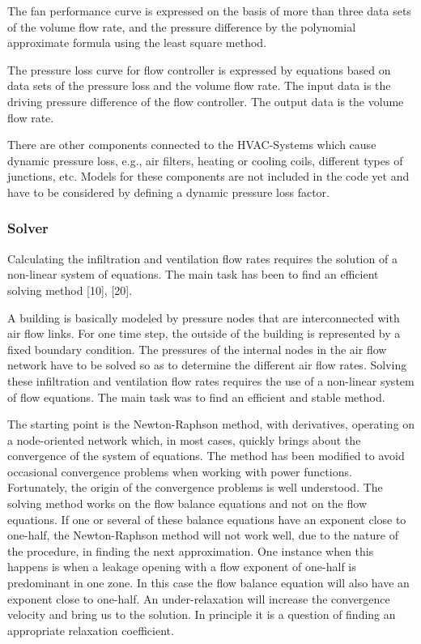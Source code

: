 \documentclass[10pt]{article}
\begin{document}
The fan performance curve is expressed on the basis of more than three data sets of the volume flow rate, and the pressure difference by the polynomial approximate formula using the least square method.

The pressure loss curve for flow controller is expressed by equations based on data sets of the pressure loss and the volume flow rate. The input data is the driving pressure difference of the flow controller. The output data is the volume flow rate.

There are other components connected to the HVAC-Systems which cause dynamic pressure loss, e.g., air filters, heating or cooling coils, different types of junctions, etc. Models for these components are not included in the code yet and have to be considered by defining a dynamic pressure loss factor.

\subsubsection{Solver}

Calculating the infiltration and ventilation flow rates requires the solution of a non-linear system of equations. The main task has been to find an efficient solving method [10], [20].

A building is basically modeled by pressure nodes that are interconnected with air flow links. For one time step, the outside of the building is represented by a fixed boundary condition. The pressures of the internal nodes in the air flow network have to be solved so as to determine the different air flow rates. Solving these infiltration and ventilation flow rates requires the use of a non-linear system of flow equations. The main task was to find an efficient and stable method.

The starting point is the Newton-Raphson method, with derivatives, operating on a node-oriented network which, in most cases, quickly brings about the convergence of the system of equations. The method has been modified to avoid occasional convergence problems when working with power functions. Fortunately, the origin of the convergence problems is well understood. The solving method works on the flow balance equations and not on the flow equations. If one or several of these balance equations have an exponent close to one-half, the Newton-Raphson method will not work well, due to the nature of the procedure, in finding the next approximation. One instance when this happens is when a leakage opening with a flow exponent of one-half is predominant in one zone. In this case the flow balance equation will also have an exponent close to one-half. An under-relaxation will increase the convergence velocity and bring us to the solution. In principle it is a question of finding an appropriate relaxation coefficient.
\end{document}
